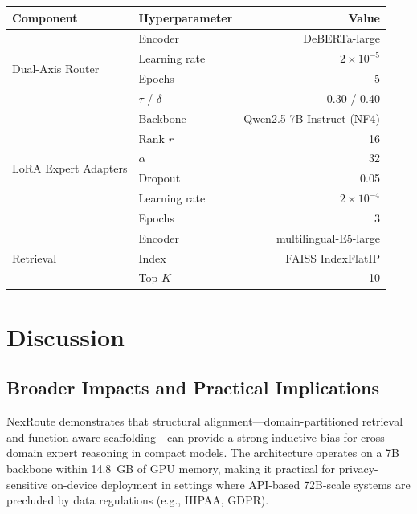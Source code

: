 \documentclass[a4paper,fleql]{cas-sc}
\begin{document}
\vspace{6pt plus 4pt minus 3pt}
\begin{center}
\begingroup
{}
\label{tab:hyperparams_all}
\begin{tabular}{llr}
\toprule
\textbf{Component} & \textbf{Hyperparameter} & \textbf{Value} \\
\midrule
\multirow{4}{*}{Dual-Axis Router}
  & Encoder           & DeBERTa-large \\
  & Learning rate     & $2 \times 10^{-5}$ \\
  & Epochs            & 5 \\
  & $\tau$ / $\delta$ & 0.30 / 0.40 \\
\midrule
\multirow{6}{*}{LoRA Expert Adapters}
  & Backbone        & Qwen2.5-7B-Instruct (NF4) \\
  & Rank $r$        & 16 \\
  & $\alpha$        & 32 \\
  & Dropout         & 0.05 \\
  & Learning rate   & $2 \times 10^{-4}$ \\
  & Epochs          & 3 \\
\midrule
\multirow{3}{*}{Retrieval}
  & Encoder  & multilingual-E5-large \\
  & Index    & FAISS IndexFlatIP \\
  & Top-$K$  & 10 \\
\bottomrule
\end{tabular}
\endgroup
\end{center}
\vspace{6pt plus 4pt minus 3pt}

\section{Discussion}
\label{sec:discussion}

\subsection{Broader Impacts and Practical Implications}
NexRoute demonstrates that structural alignment---domain-partitioned retrieval
and function-aware scaffolding---can provide a strong inductive bias for
cross-domain expert reasoning in compact models. The architecture operates on
a 7B backbone within 14.8~GB of GPU memory, making it practical for
privacy-sensitive on-device deployment in settings where API-based 72B-scale
systems are precluded by data regulations (e.g., HIPAA, GDPR).
\end{document}
